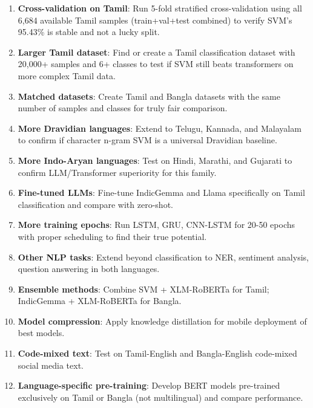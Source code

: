 \documentclass[conference]{IEEEtran}
\begin{document}
\begin{enumerate}
\item \textbf{Cross-validation on Tamil}: Run 5-fold stratified cross-validation using all 6,684 available Tamil samples (train+val+test combined) to verify SVM's 95.43\% is stable and not a lucky split.

\item \textbf{Larger Tamil dataset}: Find or create a Tamil classification dataset with 20,000+ samples and 6+ classes to test if SVM still beats transformers on more complex Tamil data.

\item \textbf{Matched datasets}: Create Tamil and Bangla datasets with the same number of samples and classes for truly fair comparison.

\item \textbf{More Dravidian languages}: Extend to Telugu, Kannada, and Malayalam to confirm if character n-gram SVM is a universal Dravidian baseline.

\item \textbf{More Indo-Aryan languages}: Test on Hindi, Marathi, and Gujarati to confirm LLM/Transformer superiority for this family.

\item \textbf{Fine-tuned LLMs}: Fine-tune IndicGemma and Llama specifically on Tamil classification and compare with zero-shot.

\item \textbf{More training epochs}: Run LSTM, GRU, CNN-LSTM for 20-50 epochs with proper scheduling to find their true potential.

\item \textbf{Other NLP tasks}: Extend beyond classification to NER, sentiment analysis, question answering in both languages.

\item \textbf{Ensemble methods}: Combine SVM + XLM-RoBERTa for Tamil; IndicGemma + XLM-RoBERTa for Bangla.

\item \textbf{Model compression}: Apply knowledge distillation for mobile deployment of best models.

\item \textbf{Code-mixed text}: Test on Tamil-English and Bangla-English code-mixed social media text.

\item \textbf{Language-specific pre-training}: Develop BERT models pre-trained exclusively on Tamil or Bangla (not multilingual) and compare performance.
\end{enumerate}
\end{document}
